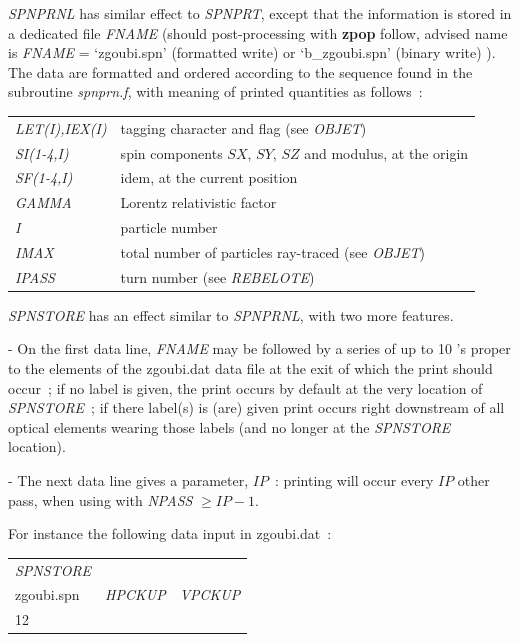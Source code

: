 \bigskip

\noindent \textsl{SPNPRNL} has similar effect to \textsl{SPNPRT}, except that the information is
stored in a  dedicated file \textsl{FNAME} (should post-processing with \textbf{zpop} follow, 
advised name is \textsl{FNAME} = `zgoubi.spn' (formatted write) or `b\_zgoubi.spn' (binary write) ). 
The data are formatted and ordered according to the  \FORTRAN sequence found in the subroutine \textsl{spnprn.f}, 
with meaning of printed quantities as follows~: 

\medskip

 \begin{tabular}{>{\sl}l!{~:}l}
	 LET(I),IEX(I)  &  tagging character and flag (see \textsl{OBJET}) \\
	 SI(1-4,I) & spin components $SX$, $SY$, $SZ$  and modulus, at the origin\\
	 SF(1-4,I)   &  idem, at the current position\\
	  GAMMA &   Lorentz relativistic factor\\
	  I  &  particle number\\
	 IMAX &  total number of particles ray-traced (see  \textsl{OBJET})\\
	 IPASS &  turn number (see \textsl{REBELOTE})\\
 \end{tabular}

\bigskip

\noindent\textsl{SPNSTORE} has an effect similar to \textsl{SPNPRNL}, with two more features. 

- On the first data line, \textsl{FNAME} may be followed 
by a series of up to 10 \LABEL's proper to the elements of the zgoubi.dat data 
file at the exit of which the print should occur~; if no label is given, 
the print occurs by default at the very location of \textsl{SPNSTORE}~; 
if there  label(s) is (are) given
print occurs right downstream of all optical elements wearing those labels
 (and no longer at the \textsl{SPNSTORE} location). 

- The next data line 
gives a parameter, $IP$~: printing will occur every $IP$ other pass, when 
using \REBELOTE{} with \textsl{NPASS} $ \geq IP-1$. 

For instance the following data input in zgoubi.dat~: 

\medskip

{\renewcommand{\arraystretch}{1}
\begin{tabular}{lll}
	\textsl{SPNSTORE} &  &   \\
	zgoubi.spn \index{zgoubi.fai} & \textsl{HPCKUP} & \textsl{VPCKUP}  \\
	12 &  & 
\end{tabular}}
\medskip

